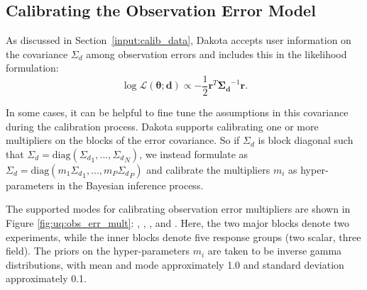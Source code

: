 \subsection{Calibrating the Observation Error Model}

As discussed in Section~\ref{input:calib_data}, Dakota accepts user
information on the covariance $\Sigma_d$ among observation errors and
includes this in the likelihood formulation:
\begin{equation*}
\log{\mathcal{L}(\boldsymbol{{\theta};d})} \propto %
-\frac{1}{2} \boldsymbol{r}^T \boldsymbol{\Sigma_d}^{-1} \boldsymbol{r}.
\end{equation*}

In some cases, it can be helpful to fine tune the assumptions in this
covariance during the calibration process.  Dakota supports
calibrating one or more multipliers on the blocks of the error
covariance.  So if $\Sigma_d$ is block diagonal such that $\Sigma_d =
\mbox{diag}({\Sigma_d}_1, ..., {\Sigma_d}_N)$, we instead formulate as
$\Sigma_d = \mbox{diag}(m_1{\Sigma_d}_1, ..., m_P{\Sigma_d}_P)$ and
calibrate the multipliers $m_i$ as hyper-parameters in the Bayesian
inference process.

The supported modes for calibrating observation error multipliers are
shown in Figure \ref{fig:uq:obs_err_mult}: ,
, , and .
Here, the two major blocks denote two experiments, while the inner
blocks denote five response groups (two scalar, three field).  The
priors on the hyper-parameters $m_i$ are taken to be inverse gamma
distributions, with mean and mode approximately 1.0 and standard
deviation approximately 0.1.

